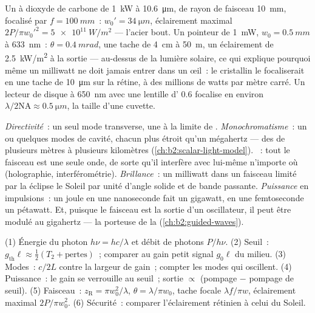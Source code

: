 \begin{example}\label{ex:b2:laser:focus}
Un  à dioxyde de carbone de \qty{1}{kW} à \qty{10.6}{\micro m}, de rayon de faisceau
\qty{10}{mm}, focalisé par $f = \qty{100}{mm}$~: $w_0' = \qty{34}{\micro m}$,
éclairement maximal $2P/\pi w_0'^2 = \qty{5e11}{W/m^2}$ --- l'acier bout.
Un pointeur de \qty{1}{mW}, $w_0 = \qty{0.5}{mm}$ à \qty{633}{nm}~: $\theta =
\qty{0.4}{mrad}$, une tache de \qty{4}{cm} à \qty{50}{m}, un éclairement de
\qty{2.5}{kW/m^2} à la sortie --- au-dessus de la lumière solaire, ce qui explique pourquoi même un
milliwatt ne doit jamais entrer dans un œil~: le cristallin le focaliserait en une
tache de \qty{10}{\micro m} sur la rétine, à des millions de watts par mètre
carré. Un lecteur de disque à \qty{650}{nm} avec une lentille d'
$0.6$ focalise en environ $\lambda/2\mathrm{NA} \approx \qty{0.5}{\micro m}$,
la taille d'une cuvette.
\end{example}

\begin{remark}\label{rem:b2:laser:special}
\emph{Directivité}~: un seul mode transverse, une  à la limite de
. \emph{Monochromatisme}~: un ou quelques modes de cavité, chacun
plus étroit qu'un mégahertz --- des  de plusieurs mètres à plusieurs kilomètres
(\cref{ch:b2:scalar-light-model}). \emph{}~: tout le
faisceau est une seule onde, de sorte qu'il interfère avec lui-même n'importe où (holographie,
interférométrie). \emph{Brillance}~: un milliwatt dans un faisceau limité par la 
éclipse le Soleil par unité d'angle solide et de bande passante. \emph{Puissance}
en impulsions~: un joule en une nanoseconde fait un gigawatt, en une femtoseconde un
pétawatt. Et, puisque le faisceau est la sortie d'un oscillateur, il peut être
modulé au gigahertz --- la porteuse de la 
(\cref{ch:b2:guided-waves}).
\end{remark}

\begin{method}\label{meth:b2:laser:method}
(1) Énergie du photon $h\nu = hc/\lambda$ et débit de photons $P/h\nu$.
(2) Seuil~: $g_{\text{th}}\ell \approx \tfrac12(T_2 + \text{pertes})$~;
comparer au gain petit signal $g_0\ell$ du milieu.
(3) Modes~: $c/2L$ contre la largeur de gain~; compter les modes qui oscillent.
(4) Puissance~: le gain se verrouille au seuil~; sortie $\propto$ (pompage $-$
pompage de seuil). (5) Faisceau~: $z_{\text{R}} = \pi w_0^2/\lambda$, $\theta =
\lambda/\pi w_0$, tache focale $\lambda f/\pi w$, éclairement maximal
$2P/\pi w_0^2$. (6) Sécurité~: comparer l'éclairement rétinien à celui du
Soleil.
\end{method}

